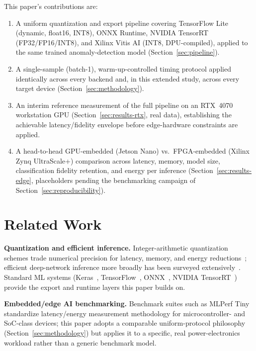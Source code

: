 \documentclass[11pt,a4paper]{article}
\begin{document}
This paper's contributions are:
\begin{enumerate}
    \item A uniform quantization and export pipeline covering TensorFlow Lite (dynamic,
    float16, INT8), ONNX Runtime, NVIDIA TensorRT (FP32/FP16/INT8), and Xilinx Vitis AI
    (INT8, DPU-compiled), applied to the same trained anomaly-detection model
    (Section~\ref{sec:pipeline}).
    \item A single-sample (batch-1), warm-up-controlled timing protocol applied
    identically across every backend and, in this extended study, across every target
    device (Section~\ref{sec:methodology}).
    \item An interim reference measurement of the full pipeline on an RTX~4070
    workstation GPU (Section~\ref{sec:results-rtx}, real data), establishing the
    achievable latency/fidelity envelope before edge-hardware constraints are applied.
    \item A head-to-head GPU-embedded (Jetson Nano) vs.\ FPGA-embedded (Xilinx Zynq
    UltraScale+) comparison across latency, memory, model size, classification fidelity
    retention, and energy per inference (Section~\ref{sec:results-edge}, placeholders
    pending the benchmarking campaign of Section~\ref{sec:reproducibility}).
\end{enumerate}

\section{Related Work}
\label{sec:related}

\textbf{Quantization and efficient inference.} Integer-arithmetic quantization schemes
trade numerical precision for latency, memory, and energy
reductions~\cite{jacob2018quantization,gholami2021quantsurvey}; efficient deep-network
inference more broadly has been surveyed extensively~\cite{sze2017efficient}. Standard
ML systems (Keras~\cite{chollet2015keras}, TensorFlow~\cite{abadi2016tensorflow},
ONNX~\cite{bai2019onnx}, NVIDIA TensorRT~\cite{nvidia2020tensorrt}) provide the export
and runtime layers this paper builds on.

\textbf{Embedded/edge AI benchmarking.} Benchmark suites such as MLPerf
Tiny~\cite{banbury2021mlperftiny} standardize latency/energy measurement methodology for
microcontroller- and SoC-class devices; this paper adopts a comparable uniform-protocol
philosophy (Section~\ref{sec:methodology}) but applies it to a specific, real
power-electronics workload rather than a generic benchmark model.
\end{document}
